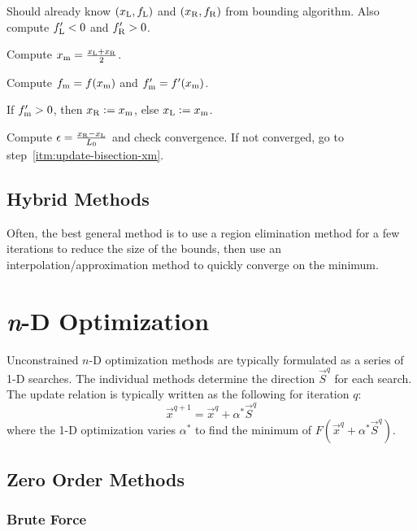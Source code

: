 \documentclass{article}
\begin{document}
\begin{enumerate*}
\setcounter{enumi}{-1}
\item Should already know \((x_{\mathrm{L}}, f_{\mathrm{L}})\) and \((x_{\mathrm{R}}, f_{\mathrm{R}})\) from bounding
  algorithm. Also compute \(f'_{\mathrm{L}} < 0\) and \(f'_{\mathrm{R}} > 0\).
\item \label{itm:update-bisection-xm} Compute \(x_{\mathrm{m}} = \frac{x_{\mathrm{L}} + x_{\mathrm{R}}}{2}\).
\item Compute \(f_{\mathrm{m}} = f(x_{\mathrm{m}})\) and \(f'_{\mathrm{m}} = f'(x_{\mathrm{m}})\).
\item If \(f'_{\mathrm{m}} > 0\), then \(x_{\mathrm{R}} := x_{\mathrm{m}}\), else \(x_{\mathrm{L}} := x_{\mathrm{m}}\).
\item Compute \(\epsilon = \frac{x_{\mathrm{R}} - x_{\mathrm{L}}}{L_0}\) and check convergence. If not
  converged, go to step~\ref{itm:update-bisection-xm}.
\end{enumerate*}

\subsection{Hybrid Methods}

Often, the best general method is to use a region elimination method for a few iterations to reduce
the size of the bounds, then use an interpolation\slash{}approximation method to quickly converge on
the minimum.

\section{\textit{n}-D Optimization}

Unconstrained \(n\)-D optimization methods are typically formulated as a series of 1-D searches. The
individual methods determine the direction \(\vec{S}^q\) for each search. The update relation is
typically written as the following for iteration \(q\):
\[\vec{x}^{q+1} = \vec{x}^q + \alpha^* \vec{S}^q\]
where the 1-D optimization varies \(\alpha^*\) to find the minimum of \(F(\vec{x}^q + \alpha^*
\vec{S}^q)\).

\subsection{Zero Order Methods}

\subsubsection{Brute Force}
\end{document}
